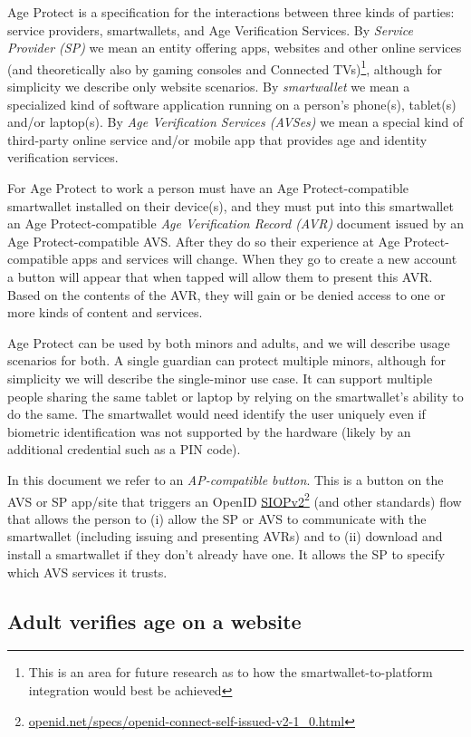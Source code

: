 \documentclass[11pt, oneside]{article}   	%
\newcommand{\hyperfootnote}[1][]{\def\ArgI{{#1}}\hyperfootnoteRelay}
\newcommand\hyperfootnoteRelay[2][]{\href{#1#2}{\ArgI}\footnote{\href{#1#2}{#2}}}
\begin{document}
Age Protect is a specification for the interactions between three kinds of parties: service providers, smartwallets, and Age Verification Services. By \emph{Service Provider (SP)} we mean an entity offering apps, websites and other online services (and theoretically also by gaming consoles and Connected TVs)\footnote{This is an area for future research as to how the smartwallet-to-platform integration would best be achieved}, although for simplicity we describe only website scenarios. By \emph{smartwallet} we mean a specialized kind of software application running on a person's phone(s), tablet(s) and/or laptop(s). By \emph{Age Verification Services (AVSes)} we mean a special kind of third-party online service and/or mobile app that provides age and identity verification services. 

For Age Protect to work a person must have an Age Protect-compatible smartwallet installed on their device(s), and they must put into this smartwallet an Age Protect-compatible \emph{Age Verification Record (AVR)} document issued by an Age Protect-compatible AVS. After they do so their experience at Age Protect-compatible apps and services will change. When they go to create a new account a button will appear that when tapped will allow them to present this AVR. Based on the contents of the AVR, they will gain or be denied access to one or more kinds of content and services. 

Age Protect can be used by both minors and adults, and we will describe usage scenarios for both. A single guardian can protect multiple minors, although for simplicity we will describe the single-minor use case. It can support multiple people sharing the same tablet or laptop by relying on the smartwallet's ability to do the same. The smartwallet would need identify the user uniquely even if biometric identification was not supported by the hardware (likely by an additional credential such as a PIN code).

In this document we refer to an \emph{AP-compatible button}. This is a button on the AVS or SP app/site that triggers an OpenID \hyperfootnote[SIOPv2][https://]{openid.net/specs/openid-connect-self-issued-v2-1\_0.html} (and other standards) flow that allows the person to (i) allow the SP or AVS to communicate with the smartwallet (including issuing and presenting AVRs) and to (ii) download and install a smartwallet if they don't already have one. It allows the SP to specify which AVS services it trusts.

\subsection{Adult verifies age on a website}
\end{document}
